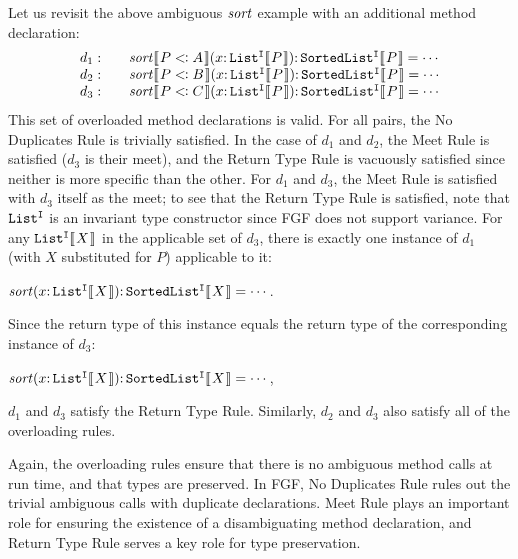 Let us revisit the above ambiguous $\mbox{\textit{sort}}$ example
with an additional method declaration:
\[\begin{array}[ht]{r@{\qquad}l}
d_1:&\mbox{\textit{sort}}\ob{P \extends A}(x \COLON \kwd{List^I}\ob{P}) \COLON \kwd{SortedList^I}\ob{P} = \cdots\\
d_2:&\mbox{\textit{sort}}\ob{P \extends B}(x \COLON \kwd{List^I}\ob{P}) \COLON \kwd{SortedList^I}\ob{P} = \cdots\\
d_3:&\mbox{\textit{sort}}\ob{P \extends C}(x \COLON \kwd{List^I}\ob{P}) \COLON \kwd{SortedList^I}\ob{P} = \cdots\\
\end{array}\]
This set of overloaded method declarations is valid.
For all pairs, the No Duplicates Rule is trivially satisfied.
In the case of $d_1$ and
$d_2$, the Meet Rule is satisfied
($d_3$ is their meet),
and the Return Type Rule is vacuously satisfied since neither is more specific than the other.
For
$d_1$ and $d_3$, the Meet Rule is satisfied with $d_3$ itself as the meet; to see that
the Return Type Rule is satisfied, note that $\mathtt{List^I}$ is an invariant
type constructor since FGF does not support variance.  For any
$\kwd{List^I}\ob{X}$ in the applicable set of $d_3$, there is exactly one instance
of $d_1$ (with $X$ substituted for $P$) applicable to it:
\begin{center}
$\mbox{\textit{sort}}(x \COLON \kwd{List^I}\ob{X}) \COLON \kwd{SortedList^I}\ob{X} = \cdots$.
\end{center}
Since the return type of this instance equals the return type of the corresponding instance of $d_3$: 
\begin{center}
$\mbox{\textit{sort}}(x \COLON \kwd{List^I}\ob{X}) \COLON \kwd{SortedList^I}\ob{X} = \cdots$,
\end{center}
$d_1$ and $d_3$ satisfy the Return Type Rule.  Similarly, $d_2$ and $d_3$
also satisfy all of the overloading rules.

Again, the overloading rules ensure that there is no ambiguous method
calls at run time, and that types are preserved.  In FGF, No Duplicates
Rule rules out the trivial ambiguous calls with duplicate declarations.
Meet Rule plays an important role for ensuring the existence of a
disambiguating method declaration, and Return Type Rule serves a key
role for type preservation.


